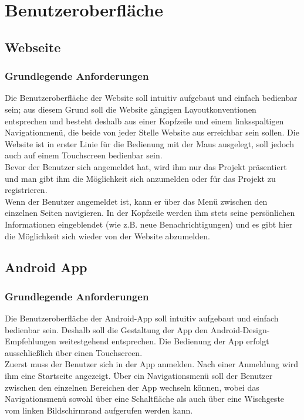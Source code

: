 \documentclass[10pt,a4paper]{article}
\begin{document}




\section{Benutzeroberfl\"ache}
\subsection{Webseite}
\subsubsection{Grundlegende Anforderungen}
Die Benutzeroberfläche der Website soll intuitiv aufgebaut und einfach bedienbar sein; aus diesem Grund soll die Website gängigen Layoutkonventionen entsprechen und besteht deshalb aus einer Kopfzeile und einem linksspaltigen Navigationmenü, die beide von jeder Stelle Website aus erreichbar sein sollen. Die Website ist in erster Linie für die Bedienung mit der Maus ausgelegt, soll jedoch auch auf einem Touchscreen bedienbar sein.\\
Bevor der Benutzer sich angemeldet hat, wird ihm nur das Projekt präsentiert und man gibt ihm die Möglichkeit sich anzumelden oder für das Projekt zu registrieren. \\
Wenn der Benutzer angemeldet ist, kann er über das Menü zwischen den einzelnen Seiten navigieren. In der Kopfzeile werden ihm stets seine persönlichen Informationen eingeblendet (wie z.B. neue Benachrichtigungen) und es gibt hier die Möglichkeit sich wieder von der Website abzumelden.
\subsection{Android App}
\subsubsection{Grundlegende Anforderungen}
Die Benutzeroberfläche der Android-App soll intuitiv aufgebaut und einfach bedienbar sein. Deshalb
soll die Gestaltung der App den Android-Design-Empfehlungen weitestgehend entsprechen. Die Bedienung
der App erfolgt ausschließlich über einen Touchscreen. \\
Zuerst muss der Benutzer sich in der App anmelden. Nach einer Anmeldung wird ihm eine Startseite angezeigt. Über ein Navigationsmenü soll der Benutzer zwischen den einzelnen Bereichen der App wechseln können, wobei das Navigationsmenü sowohl über eine Schaltfläche als auch über eine Wischgeste vom linken Bildschirmrand aufgerufen werden kann.

\end{document}
